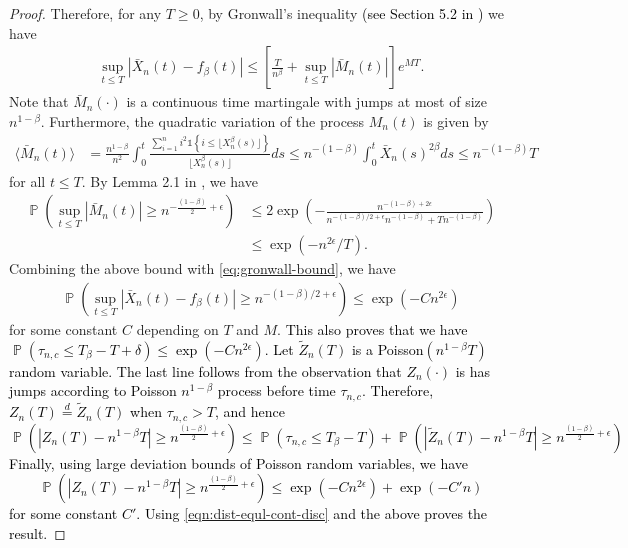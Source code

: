 \documentclass[letterpaper,11pt,reqno]{amsart}
\theoremstyle{definition}
\renewcommand{\leq}{\leqslant}
\renewcommand{\geq}{\geqslant}
\newcommand{\ind}{\mathds{1}}
\newcommand{\abs}[1]{\left\vert#1\right\vert}
\newcommand{\set}[1]{\left\{#1\right\}}
\DeclareMathOperator{\pr}{\mathds{P}}
\begin{document}
\begin{proof}
    Therefore, for any $T \geq 0$, by Gronwall's inequality \textcolor{black}{(see Section 5.2 in \cite{oksendall})} we have \begin{align}\label{eq:gronwall-bound}
        \sup_{t\leq T}  \abs{\bar{X}_n(t) - f_{\beta}(t)} \leq \left[\frac{T}{n^{\beta}} + \sup_{t\leq T}|\bar{M}_n(t)|\right] e^{M T}.
    \end{align} Note that $\bar{M}_{n}(\cdot)$ is a continuous time martingale with jumps at most of size $n^{1-\beta}.$ Furthermore, the quadratic variation of the process $M_n(t)$ is given by\begin{align*}
        \langle \bar{M}_n(t)\rangle &= \frac{n^{1-\beta}}{n^2} \int_0^t \frac{\sum_{i=1}^n i^2\ind\set{i\leq \lfloor X_n^\beta(s)\rfloor}}{\lfloor X_n^\beta(s)\rfloor} ds \leq n^{-(1-\beta)} \int_{0}^t \bar{X}_n(s)^{2\beta}ds \leq n^{-(1-\beta)} T
    \end{align*} for all $t\leq T$. By Lemma 2.1 in \cite{vandeGeer} , we have \begin{align*}
        \pr\left(\sup_{t\leq T}|\bar{M}_n(t)| \geq n^{-\frac{(1-\beta)}{2} +\epsilon }\right) &\leq 2 \exp\left(-\frac{n^{-(1-\beta) + 2\epsilon}}{n^{-(1-\beta)/2  + \epsilon} n^{-(1-\beta)} + T n^{-(1-\beta)}} \right)\\
        &\leq \exp\left(-n^{2\epsilon}/T\right).
    \end{align*} Combining the above bound with \eqref{eq:gronwall-bound}, we have \begin{align}\label{eqn:cont-time-bound}
        \pr\left(\sup_{t\leq T} \abs{\bar{X}_n(t) - f_{\beta}(t)} \geq n^{-(1-\beta)/2 +\epsilon}\right) \leq \exp\left(-C n^{2\epsilon}\right)
    \end{align} for some constant $C$ depending on $T$ and $M$. \textcolor{black}{This also proves that we have  $\pr(\tau_{n,c} \leq T_\beta- T+\delta) \leq \exp(-Cn^{2\epsilon}).$ Let $\tilde{Z}_n(T)$ is a Poisson$(n^{1-\beta} T)$ random variable. The last line follows from the observation that $Z_n(\cdot)$ is has jumps according to Poisson $n^{1-\beta}$ process before time $\tau_{n,c}$. Therefore, $Z_n(T) \stackrel{d}{=} \tilde{Z}_n(T)$ when $\tau_{n,c} > T$, and hence $$\pr\left(\abs{Z_n(T)-n^{1-\beta}T}\geq n^{\frac{(1-\beta)}{2}+\epsilon}\right) 
    \leq \pr(\tau_{n,c} \leq T_\beta- T) + \pr\left(\abs{\tilde{Z}_n(T) -n^{1-\beta}T} \geq  n^{\frac{(1-\beta)}{2}+\epsilon}\right) $$ Finally, using large deviation bounds of Poisson random variables, we have $$\pr\left(\abs{Z_n(T)-n^{1-\beta}T}\geq n^{\frac{(1-\beta)}{2}+\epsilon}\right) \leq \exp(-Cn^{2\epsilon}) + \exp\left(-C'n\right)$$ for some constant $C'.$ Using \eqref{eqn:dist-equl-cont-disc} and the above proves the result.} \end{proof}
\end{document}
